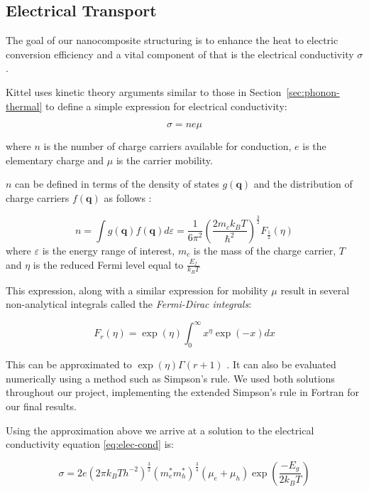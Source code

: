 \documentclass[12pt]{article}
\newcommand{\secref}[2][Section~]{#1\ref{#2}}
\renewcommand{\vec}[1]{\mathbf{#1}}
\begin{document}
\subsection{Electrical Transport}
\label{sec:electrical-transport}
The goal of our nanocomposite structuring is to enhance the heat to electric conversion efficiency and a vital component of that is the electrical conductivity $\sigma$. 

Kittel \cite{kittel} uses kinetic theory arguments similar to those in \secref{sec:phonon-thermal} to define a simple expression for electrical conductivity:

\begin{equation}
\label{eq:elec-cond}
	\sigma = n e \mu
\end{equation}

where $n$ is the number of charge carriers available for conduction, $e$ is the elementary charge and $\mu$ is the carrier mobility.

$n$ can be defined in terms of the density of states $g(\vec{q})$ and the distribution of charge carriers $f(\vec{q})$ as follows \cite{kittel}:

\begin{equation}
\label{eq:carrier-number}
	n = \int g(\vec{q}) f(\vec{q}) d\varepsilon = \frac{1}{6\pi^2} \left(\frac{2m_c k_B T}{\hbar^2}\right)^\frac{3}{2} F_\frac{1}{2}(\eta)
\end{equation}
where $\varepsilon$ is the energy range of interest, $m_c$ is the mass of the charge carrier, $T$ and $\eta$ is the reduced Fermi level equal to $\frac{E_f}{k_B T}$

This expression, along with a similar expression for mobility $\mu$ \cite{kittel} result in several non-analytical integrals called the \emph{Fermi-Dirac integrals}:

\begin{equation}
\label{eq:fermi-integral}
	F_r(\eta) = \exp(\eta) \int_0^\infty x^\eta \exp(-x) dx
\end{equation}

This can be approximated to $\exp(\eta)\Gamma(r+1)$ \cite{kittel}. It can also be evaluated numerically using a method such as Simpson's rule. We used both solutions throughout our project, implementing the extended Simpson's rule in Fortran for our final results.

Using the approximation above we arrive at a solution to the electrical conductivity equation \eqref{eq:elec-cond} is:

\begin{equation}
\label{eq:electrical-conductivity}
	\sigma = 2e (2\pi k_B T h^{-2})^\frac{3}{2} (m_e^* m_h^*)^\frac{3}{4} (\mu_e + \mu_h) \exp \left(\frac{-E_g}{2k_B T}\right)
\end{equation}
\end{document}
